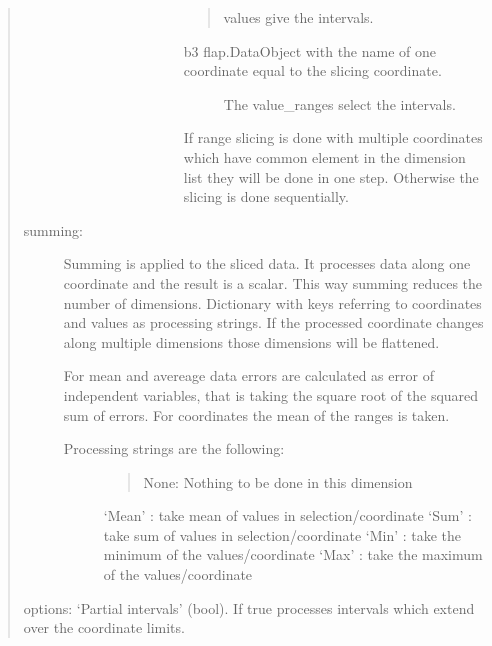\documentclass[letterpaper,10pt,english]{sphinxmanual}
\begin{document}
\begin{fulllineitems}
\begin{fulllineitems}
\begin{quote}
\begin{description}
\begin{description}
\begin{description}
\begin{description}
\begin{quote}
values give the intervals.
\end{quote}
\begin{description}
\item[{b3 flap.DataObject with the name of one coordinate equal to the slicing coordinate.}] \leavevmode
The value\_ranges select the intervals.

\end{description}

If range slicing is done with multiple coordinates which have common element in the
dimension list they will be done in one step. Otherwise the slicing is done sequentially.

\end{description}

\end{description}

\end{description}

\item[{summing:}] \leavevmode
Summing is applied to the sliced data. It processes data along one coordinate
and the result is a scalar. This way summing reduces the number of dimensions.
Dictionary with keys referring to coordinates and values as processing strings. If
the processed coordinate changes along multiple dimensions those dimensions will be flattened.

For mean and avereage data errors are calculated as error of independent variables, that is taking the square
root of the squared sum of errors. For coordinates the mean of the ranges is taken.
\begin{description}
\item[{Processing strings are the following:}] \leavevmode\begin{quote}

None: Nothing to be done in this dimension
\end{quote}

‘Mean’ : take mean of values in selection/coordinate
‘Sum’  : take sum of values in selection/coordinate
‘Min’  : take the minimum of the values/coordinate
‘Max’  : take the maximum of the values/coordinate

\end{description}

\item[{options: ‘Partial intervals’  (bool). If true processes intervals which extend over the coordinate limits.}] \leavevmode\begin{quote}


\end{quote}
\end{description}
\end{quote}
\end{fulllineitems}
\end{fulllineitems}
\end{document}
